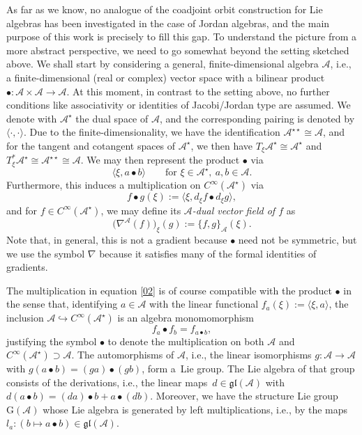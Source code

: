 \documentclass[10pt,a4paper]{amsart}
\numberwithin{equation}{section}
\newcommand{\be}{\begin{equation}}
\newcommand{\ee}{\end{equation}}
\newcommand{\G}{\mathrm{G}}
\newcommand{\gl}{{\mathfrak{gl}}}
\newcommand{\cA}{\mathcal{A}}
\begin{document}
As far as we know, no analogue of the coadjoint orbit construction for Lie algebras has been investigated in the case of Jordan algebras, and the main purpose of this work is precisely to fill this gap.
To understand the picture from a more abstract perspective, we need to go somewhat beyond the setting sketched above. We shall start by considering a general, finite-dimensional algebra $\cA$, i.e., a finite-dimensional (real or complex) vector space with a bilinear product $\bullet\colon \cA \times \cA \to \cA$.
At this moment, in contrast to the setting above, no further conditions like associativity or identities of Jacobi/Jordan type are assumed.
We denote with $\cA^\star$ the dual space of $\cA$, and the corresponding pairing is denoted by $\langle \cdot,\cdot \rangle$.
Due to the finite-dimensionality, we have the identification $\cA^{\star\star} \cong \cA$, and
for the tangent and cotangent spaces of $\cA^\star$, we then have $T_\xi
\cA^\star \cong \cA^\star$ and $T^\ast_\xi \cA^\star \cong \cA^{\star\star}
\cong \cA$. We may then represent the product $\bullet$
via
\begin{equation}
 \label{01}
 \langle \xi, a \bullet b\rangle \qquad \text{for }\xi
 \in \cA^\star, \ a, b \in \cA.
\end{equation}
Furthermore, this induces a multiplication on $C^\infty(\cA^\star)$ via
\be \label{02}
f \bullet g(\xi) :=
\langle \xi, d_\xi f
\bullet d_\xi g \rangle,
\ee
and for $f\in C^\infty(\cA^\star)$, we may define its {\em $\cA$-dual vector field of $f$} as
\[%
\big(\nabla^{\cA}(f)\big)_\xi(g) :=\{f, g\}_\cA(\xi).
\]
Note that, in general, this is not a gradient because $\bullet$ need not be symmetric, but we use the symbol $\nabla$ because it satisfies many of the formal identities of gradients.

The multiplication in equation \eqref{02} is of course compatible with the product $\bullet$ in the sense that, identifying $a\in \cA$ with the linear functional $ f_a(\xi) := \langle \xi, a\rangle$, the inclusion $\cA \hookrightarrow C^\infty(\cA^\star)$ is an algebra monomomorphism
\[
f_a \bullet f_b = f_{a \bullet b},
\]
justifying the symbol $\bullet$ to denote the multiplication on both $\cA$ and $C^\infty(\cA^\star) \supset \cA$. The automorphisms of $\cA$, i.e., the linear isomorphisms $g\colon \cA \to \cA$ with $g(a \bullet b) = (ga) \bullet (gb)$, form a~Lie group.
The Lie
algebra of that group consists of the derivations, i.e., the linear maps~$d \in \gl(\cA)$ with $d(a \bullet b) = (da) \bullet b + a \bullet
(db)$.
Moreover, we have the structure Lie group $\G(\cA)$ whose Lie algebra is generated by left multiplications, i.e., by the maps $l_a\colon (b \mapsto a \bullet b) \in \gl(\cA)$.
\end{document}
